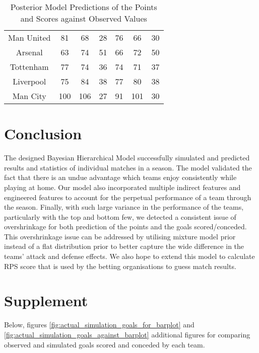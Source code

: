 \documentclass{article}
\begin{document}
\begin{table}[!htb]
\begin{tabular}{c|ccc|ccc}
Man United            & 81     & 68           & 28             & 76     & 66           & 30             \\
Arsenal               & 63     & 74           & 51             & 66     & 72           & 50             \\
Tottenham             & 77     & 74           & 36             & 74     & 71           & 37             \\
Liverpool             & 75     & 84           & 38             & 77     & 80           & 38             \\
Man City              & 100    & 106          & 27             & 91     & 101          & 30        
\end{tabular}
\caption{\label{tab:observed_bayesian_model_goals_points}Posterior Model Predictions of the Points and Scores against Observed Values}
\end{table}

\section{Conclusion}
The designed Bayesian Hierarchical Model successfully simulated and predicted results and statistics of individual matches in a season. The model validated the fact that there is an undue advantage which teams enjoy consistently while playing at home. Our model also incorporated multiple indirect features and engineered features to account for the perpetual performance of a team through the season. Finally, with such large variance in the performance of the teams, particularly with the top and bottom few, we detected a consistent issue of overshrinkage for both prediction of the points and the goals scored/conceded. This overshrinkage issue can be addressed by utilising mixture model prior instead of a flat distribution prior to better capture the wide difference in the teams’ attack and defense effects. We also hope to extend this model to calculate RPS score that is used by the betting organisations to guess match results.


\medskip

\printbibliography

\section{Supplement}

Below, figures \ref{fig:actual_simulation_goals_for_barplot} and \ref{fig:actual_simulation_goals_against_barplot} additional figures for comparing observed and simulated goals scored and conceded by each team.
\end{document}
